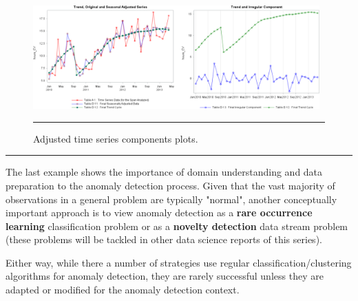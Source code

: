 \begin{Example}
\begin{figure}[t]
\centering
\includegraphics[width=0.98\textwidth]{Images/adjustedplot.png}
\caption{Adjusted time series components plots.}\hrule
\label{fig:adjusted}
\end{figure}
\end{Example}
\begin{center}
    \rule{0.25\textwidth}{.4pt}
\end{center}
The last example shows the importance of domain understanding and data preparation to the anomaly detection process. Given that the vast majority of observations in a general problem are typically "normal", another conceptually important approach is to view anomaly detection as a \textbf{rare occurrence learning} classification problem or as a \textbf{novelty detection} data stream problem (these problems will be tackled in other data science reports of this series). \par Either way, while there a number of strategies use regular classification/clustering algorithms for anomaly detection, they are rarely successful unless they are adapted or modified for the anomaly detection context.  
